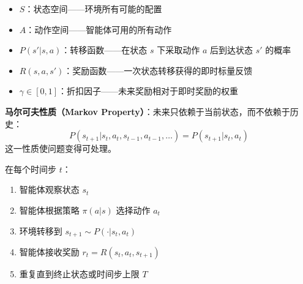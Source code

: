 \begin{itemize}
  \item $S$：状态空间——环境所有可能的配置
  \item $A$：动作空间——智能体可用的所有动作
  \item $P(s'|s, a)$：转移函数——在状态 $s$ 下采取动作 $a$ 后到达状态 $s'$ 的概率
  \item $R(s, a, s')$：奖励函数——一次状态转移获得的即时标量反馈
  \item $\gamma \in [0, 1]$：折扣因子——未来奖励相对于即时奖励的权重
\end{itemize}

\textbf{马尔可夫性质（Markov Property）}：未来只依赖于当前状态，而不依赖于历史：
\[
P(s_{t+1} | s_t, a_t, s_{t-1}, a_{t-1}, \ldots) = P(s_{t+1} | s_t, a_t)
\]
这一性质使问题变得可处理。

\begin{intuitionbox}
在每个时间步 $t$：

\begin{enumerate}
  \item 智能体观察状态 $s_t$
  \item 智能体根据策略 $\pi(a|s)$ 选择动作 $a_t$
  \item 环境转移到 $s_{t+1} \sim P(\cdot|s_t, a_t)$
  \item 智能体接收奖励 $r_t = R(s_t, a_t, s_{t+1})$
  \item 重复直到终止状态或时间步上限 $T$
\end{enumerate}
\end{intuitionbox}


